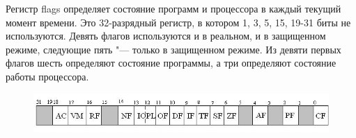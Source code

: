 Регистр flags определяет состояние программ и процессора в каждый текущий момент времени. Это 32-разрядный регистр, 
в котором 1, 3, 5, 15, 19-31 биты не используются. Девять флагов используются и в реальном, и в защищенном режиме,
следующие пять "--- только в защищенном режиме. Из девяти первых флагов шесть определяют состояние программы, а три определяют
состояние работы процессора. 

\begin{figure}[H]
    \centering
    \includegraphics[scale = 0.5]{flags.jpg}
\end{figure}


